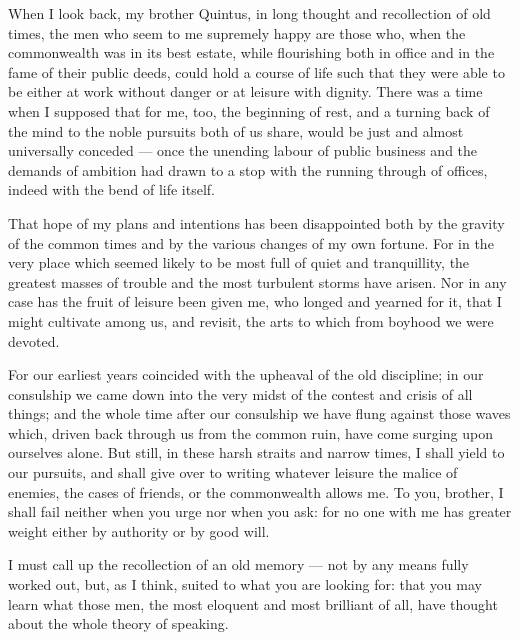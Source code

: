 

 When I look back, my brother Quintus, in long thought and recollection of old times, the men who seem to me supremely happy are those who, when the commonwealth was in its best estate, while flourishing both in office and in the fame of their public deeds, could hold a course of life such that they were able to be either at work without danger or at leisure with dignity. There was a time when I supposed that for me, too, the beginning of rest, and a turning back of the mind to the noble pursuits both of us share, would be just and almost universally conceded — once the unending labour of public business and the demands of ambition had drawn to a stop with the running through of offices, indeed with the bend of life itself.

 That hope of my plans and intentions has been disappointed both by the gravity of the common times and by the various changes of my own fortune. For in the very place which seemed likely to be most full of quiet and tranquillity, the greatest masses of trouble and the most turbulent storms have arisen. Nor in any case has the fruit of leisure been given me, who longed and yearned for it, that I might cultivate among us, and revisit, the arts to which from boyhood we were devoted.

 For our earliest years coincided with the upheaval of the old discipline; in our consulship we came down into the very midst of the contest and crisis of all things; and the whole time after our consulship we have flung against those waves which, driven back through us from the common ruin, have come surging upon ourselves alone. But still, in these harsh straits and narrow times, I shall yield to our pursuits, and shall give over to writing whatever leisure the malice of enemies, the cases of friends, or the commonwealth allows me. To you, brother, I shall fail neither when you urge nor when you ask: for no one with me has greater weight either by authority or by good will.

 I must call up the recollection of an old memory — not by any means fully worked out, but, as I think, suited to what you are looking for: that you may learn what those men, the most eloquent and most brilliant of all, have thought about the whole theory of speaking.

